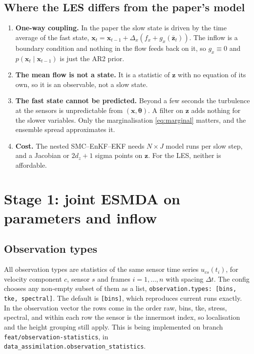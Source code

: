 \documentclass[11pt,a4paper]{article}
\begin{document}
\subsection*{Where the LES differs from the paper's model}
\begin{enumerate}
\item \textbf{One-way coupling.} In the paper the slow state is driven by the
  time average of the fast state, $\bm x_t = \bm x_{t-1} + \Delta_x(f_x +
  g_x(\bar{\bm z}_t))$. The inflow is a boundary condition and nothing in the
  flow feeds back on it, so $g_x \equiv 0$ and $p(\bm x_t \mid \bm x_{t-1})$
  is just the AR2 prior.
\item \textbf{The mean flow is not a state.} It is a statistic of $\bm z$ with
  no equation of its own, so it is an observable, not a slow state.
\item \textbf{The fast state cannot be predicted.} Beyond a few seconds the
  turbulence at the sensors is unpredictable from $(\bm x, \bm\theta)$. A
  filter on $\bm z$ adds nothing for the slower variables. Only the
  marginalisation \eqref{eq:marginal} matters, and the ensemble spread
  approximates it.
\item \textbf{Cost.} The nested SMC--EnKF--EKF needs $N\times J$ model runs per
  slow step, and a Jacobian or $2d_z+1$ sigma points on $\bm z$. For the LES,
  neither is affordable.
\end{enumerate}

\section{Stage 1: joint ESMDA on parameters and inflow}

\subsection{Observation types}
All observation types are statistics of the same sensor time series
$u_{cs}(t_i)$, for velocity component $c$, sensor $s$ and frames
$i = 1,\dots,n$ with spacing $\Delta t$. The config chooses any non-empty subset
of them as a list, \texttt{observation.types: [bins, tke, spectral]}. The
default is \texttt{[bins]}, which reproduces current runs exactly. In the
observation vector the rows come in the order raw, bins, tke, stress,
spectral, and within each row the sensor is the innermost index, so
localisation and the height grouping still apply. This is being implemented on branch
\texttt{feat/observation-statistics}, in
\texttt{data\_assimilation.observation\_statistics}.
\end{document}
